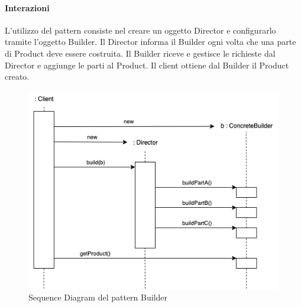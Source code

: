 \paragraph{Interazioni} L'utilizzo del pattern consiste nel creare un oggetto Director e configurarlo tramite l'oggetto Builder. Il Director informa il Builder ogni volta che una parte di Product deve essere costruita. Il Builder riceve e gestisce le richieste dal Director e aggiunge le parti al Product. Il client ottiene dal Builder il Product creato.

\begin{figure}[H]
    \centering
    \includegraphics[width=1\linewidth]{assets/pattern/builder/builder-sequence.drawio.png}
    \caption{Sequence Diagram del pattern Builder}
\end{figure}

\newpage